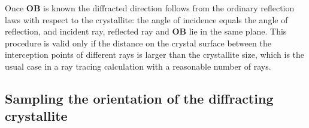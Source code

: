 \documentclass{iucr}
\newcommand{\todo}[1]{{\color{red}[TODO: "#1'']}}
\begin{document}
Once $\mathbf{OB}$ is known the diffracted direction follows from the ordinary
reflection laws with respect to the crystallite: the angle of incidence equals the
angle of reflection, and incident ray, reflected ray and $\mathbf{OB}$ lie in the
same plane. This procedure is valid only if the distance on the crystal surface
between the interception points of different rays is larger than the crystallite
size, which is the usual case in a ray tracing calculation with a reasonable number
of rays.


\subsection{Sampling the orientation of the diffracting crystallite}
\label{sec:geometry:sampling}
\end{document}
